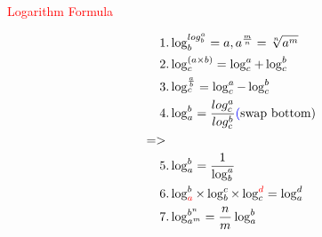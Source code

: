 \documentclass[12pt]{standalone}
\begin{document}
\abovedisplayskip=12pt  
\belowdisplayskip=12pt  
\abovedisplayshortskip=0pt  
\belowdisplayshortskip=7pt
\begin{minipage}[b][12cm][t]{1.00\textwidth}
\centering
\textcolor{red}{\Large{Logarithm Formula}}
\begin{Large}\begin{align*}
1&.\log_b^{log_b^{a}}=a,a^{\frac{m}{n}}=\sqrt[n]{a^m}\\
2&.\log_c^{(a\times{b})}=\log_c^{a}+\log_c^{b}\\
3&.\log_c^{\frac{a}{b}}=\log_c^{a}-\log_c^{b}\\
4&.\log_a^{b}=\frac{log_c^{a}}{log_c^{b}}\text{\textcolor{blue}(swap bottom)}\\
=>\\
5&.\log_a^b=\frac{1}{\log_b^a}\\
6&.\log_{\textcolor{red}a}^b\times\log_b^c\times\log_c^{\textcolor{red}d}=\log_a^d\\
7&.\log_{a^m}^{b^n}=\frac{n}{m}\log_a^b
\end{align*}\end{Large}
\end{minipage}
\end{document}
